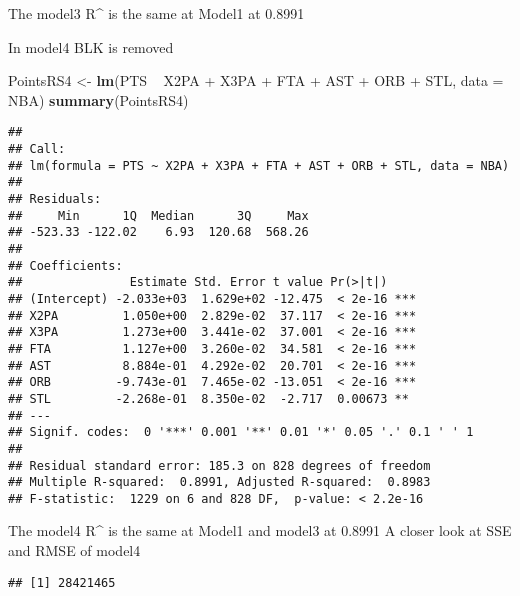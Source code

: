 \documentclass[]{article}
\newenvironment{Shaded}{\begin{snugshade}}{\end{snugshade}}
\newcommand{\KeywordTok}[1]{\textcolor[rgb]{0.13,0.29,0.53}{\textbf{{#1}}}}
\newcommand{\DataTypeTok}[1]{\textcolor[rgb]{0.13,0.29,0.53}{{#1}}}
\newcommand{\DecValTok}[1]{\textcolor[rgb]{0.00,0.00,0.81}{{#1}}}
\newcommand{\StringTok}[1]{\textcolor[rgb]{0.31,0.60,0.02}{{#1}}}
\newcommand{\NormalTok}[1]{{#1}}
\begin{document}
The model3 R\^{} is the same at Model1 at 0.8991

In model4 BLK is removed

\begin{Shaded}
\begin{Highlighting}[]
\NormalTok{PointsRS4 <-}\StringTok{ }\KeywordTok{lm}\NormalTok{(PTS ~}\StringTok{ }\NormalTok{X2PA +}\StringTok{ }\NormalTok{X3PA +}\StringTok{ }\NormalTok{FTA +}\StringTok{ }\NormalTok{AST +}\StringTok{ }\NormalTok{ORB +}\StringTok{ }\NormalTok{STL, }\DataTypeTok{data =} \NormalTok{NBA)}
\KeywordTok{summary}\NormalTok{(PointsRS4)}
\end{Highlighting}
\end{Shaded}

\begin{verbatim}
## 
## Call:
## lm(formula = PTS ~ X2PA + X3PA + FTA + AST + ORB + STL, data = NBA)
## 
## Residuals:
##     Min      1Q  Median      3Q     Max 
## -523.33 -122.02    6.93  120.68  568.26 
## 
## Coefficients:
##               Estimate Std. Error t value Pr(>|t|)    
## (Intercept) -2.033e+03  1.629e+02 -12.475  < 2e-16 ***
## X2PA         1.050e+00  2.829e-02  37.117  < 2e-16 ***
## X3PA         1.273e+00  3.441e-02  37.001  < 2e-16 ***
## FTA          1.127e+00  3.260e-02  34.581  < 2e-16 ***
## AST          8.884e-01  4.292e-02  20.701  < 2e-16 ***
## ORB         -9.743e-01  7.465e-02 -13.051  < 2e-16 ***
## STL         -2.268e-01  8.350e-02  -2.717  0.00673 ** 
## ---
## Signif. codes:  0 '***' 0.001 '**' 0.01 '*' 0.05 '.' 0.1 ' ' 1
## 
## Residual standard error: 185.3 on 828 degrees of freedom
## Multiple R-squared:  0.8991, Adjusted R-squared:  0.8983 
## F-statistic:  1229 on 6 and 828 DF,  p-value: < 2.2e-16
\end{verbatim}

The model4 R\^{} is the same at Model1 and model3 at 0.8991 A closer
look at SSE and RMSE of model4

\begin{Shaded}
\end{Shaded}

\begin{verbatim}
## [1] 28421465
\end{verbatim}
\end{document}

